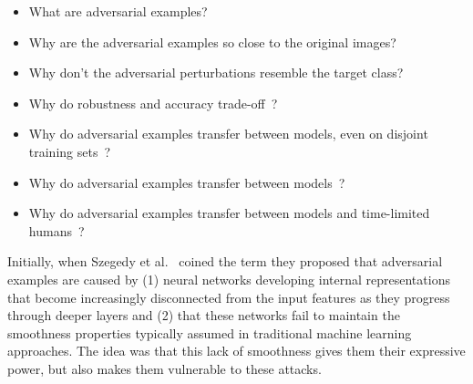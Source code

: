 \documentclass[a4paper, oneside]{discothesis}
\begin{document}
\begin{itemize}
	\setlength\itemsep{0em}
	\item What are adversarial examples?
	\item Why are the adversarial examples so close to the original images?
	\item Why don't the adversarial perturbations resemble the target class?
	\item Why do robustness and accuracy trade-off~\cite{zhang2019theoretically}?
	\item Why do adversarial examples transfer between models, even on disjoint training sets~\cite{szegedy2013intriguing}?
	\item Why do adversarial examples transfer between models~\cite{szegedy2013intriguing}?
	\item Why do adversarial examples transfer between models and time-limited humans~\cite{elsayed2018adversarial}?
\end{itemize}

Initially, when Szegedy et al.\ \cite{szegedy2013intriguing} coined the term they proposed that adversarial examples are caused by (1) neural networks developing internal representations that become increasingly disconnected from the input features as they progress through deeper layers and (2) that these networks fail to maintain the smoothness properties typically assumed in traditional machine learning approaches. The idea was that this lack of smoothness gives them their expressive power, but also makes them vulnerable to these attacks.
\end{document}
